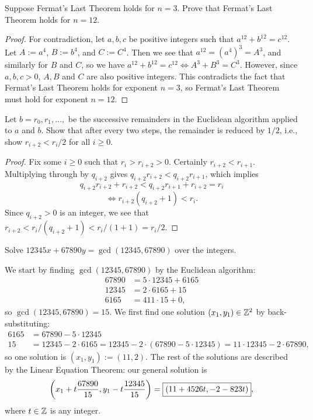 \documentclass{article}
\begin{document}
\begin{exercise}
Suppose Fermat's Last Theorem holds for $n=3$. Prove that Fermat's Last Theorem holds for $n=12$.
\end{exercise}
\begin{proof}
For contradiction, let $a,b,c$ be positive integers such that $a^{12} + b^{12} = c^{12}$. Let $A := a^4$, $B := b^4$, and $C := C^4$. Then we see that $a^{12} = (a^4)^3 = A^3$, and similarly for $B$ and $C$, so we have $a^{12}+b^{12} = c^{12} \iff A^3 + B^3 = C^3.$
However, since $a,b,c>0$, $A, B$ and $C$ are also positive integers. This contradicts the fact that Fermat's Last Theorem holds for exponent $n=3$, so Fermat's Last Theorem must hold for exponent $n=12$.
\end{proof}

\begin{exercise}[Chapter 5, \#3]
Let $b=r_0, r_1, \ldots,$ be the successive remainders in the Euclidean algorithm applied to $a$ and $b$. Show that after every two steps, the remainder is reduced by $1/2$, i.e., show $r_{i+2} < r_i/2$ for all $i\geq 0$.
\end{exercise}
\begin{proof}
Fix some $i \geq 0$ such that $r_i>r_{i+2} > 0$. Certainly $r_{i+2} < r_{i+1}$. Multiplying through by $q_{i+2}$ gives $q_{i+2}r_{i+2} < q_{i+2}r_{i+1}$, which implies 
$$q_{i+2}r_{i+2} + r_{i+2} < q_{i+2}r_{i+1} + r_{i+2} = r_i$$
$$\iff r_{i+2}(q_{i+2}+1) < r_i.$$
Since $q_{i+2} > 0$ is an integer, we see that $r_{i+2} < r_i/(q_{i+2}+1) < r_i/(1+1) = r_i/2$.
\end{proof}

\begin{exercise}[Chapter 6, \#2b]
Solve $12345x + 67890y = \gcd(12345, 67890)$ over the integers.
\end{exercise}
\begin{solution}
We start by finding $\gcd(12345, 67890)$ by the Euclidean algorithm:
\begin{align*}
    67890 &= 5\cdot 12345 + 6165 \\
    12345 &= 2\cdot 6165 + 15 \\
    6165 &=  411\cdot 15 + 0,
\end{align*}
so $\gcd(12345, 67890) = 15$. We first find one solution $(x_1, y_1)\in \mathbb Z^2$ by back-substituting:
\begin{align*}
6165 &= 67890 - 5\cdot 12345 \\
15 &= 12345 - 2\cdot 6165 = 12345 - 2\cdot (67890 - 5\cdot 12345) = 11\cdot 12345 - 2\cdot 67890,
\end{align*}
so one solution is $(x_1, y_1) := (11, 2)$. The rest of the solutions are described by the Linear Equation Theorem: our general solution is 
$$\left(x_1 + t\frac{67890}{15}, y_1-t\frac{12345}{15} \right) = \boxed{\left(11 + 4526t, -2-823t \right)},$$
where $t\in\mathbb Z$ is any integer.
\end{solution}
\end{document}
